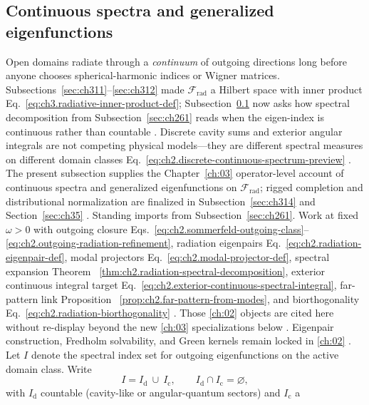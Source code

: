 \subsection{Continuous spectra and generalized eigenfunctions}
\label{sec:ch313}
Open domains radiate through a \emph{continuum} of outgoing directions long before anyone chooses
spherical-harmonic indices or Wigner matrices. Subsections~\ref{sec:ch311}--\ref{sec:ch312} made
\(\mathcal{F}_{\mathrm{rad}}\) a Hilbert space with inner product
Eq.~\eqref{eq:ch3.radiative-inner-product-def}; Subsection~\ref{sec:ch313} now asks how spectral
decomposition from Subsection~\ref{sec:ch261} reads when the eigen-index is continuous rather than
countable \cite{stratton1941}. Discrete cavity sums and exterior angular
integrals are not competing physical models---they are different spectral measures on different domain
classes Eq.~\eqref{eq:ch2.discrete-continuous-spectrum-preview} \cite{stratton1941}. The present
subsection supplies the Chapter~\ref{ch:03} operator-level account of continuous spectra and
generalized eigenfunctions on \(\mathcal{F}_{\mathrm{rad}}\); rigged completion and distributional
normalization are finalized in Subsection~\ref{sec:ch314} and Section~\ref{sec:ch35}
\cite{harrington2001}.
Standing imports from Subsection~\ref{sec:ch261}. Work at fixed \(\omega>0\) with outgoing closure
Eqs.~\eqref{eq:ch2.sommerfeld-outgoing-class}--\eqref{eq:ch2.outgoing-radiation-refinement}, radiation
eigenpairs Eq.~\eqref{eq:ch2.radiation-eigenpair-def}, modal projectors
Eq.~\eqref{eq:ch2.modal-projector-def}, spectral expansion Theorem
~\ref{thm:ch2.radiation-spectral-decomposition}, exterior continuous integral target
Eq.~\eqref{eq:ch2.exterior-continuous-spectral-integral}, far-pattern link Proposition
~\ref{prop:ch2.far-pattern-from-modes}, and biorthogonality
Eq.~\eqref{eq:ch2.radiation-biorthogonality} \cite{stratton1941}. Those
\ref{ch:02} objects are cited here without re-display beyond the new \ref{ch:03}
specializations below \cite{stratton1941}. Eigenpair construction, Fredholm solvability, and Green
kernels remain locked in \ref{ch:02} \cite{harrington2001}.
Let \(I\) denote the spectral index set for outgoing eigenfunctions on the active domain class.
Write
\begin{equation}
\label{eq:ch3.spectral-index-partition}
I
=
I_{\mathrm{d}}\ \cup\ I_{\mathrm{c}},
\qquad
I_{\mathrm{d}}\cap I_{\mathrm{c}}=\varnothing,
\end{equation}
with \(I_{\mathrm{d}}\) countable (cavity-like or angular-quantum sectors) and \(I_{\mathrm{c}}\) a
